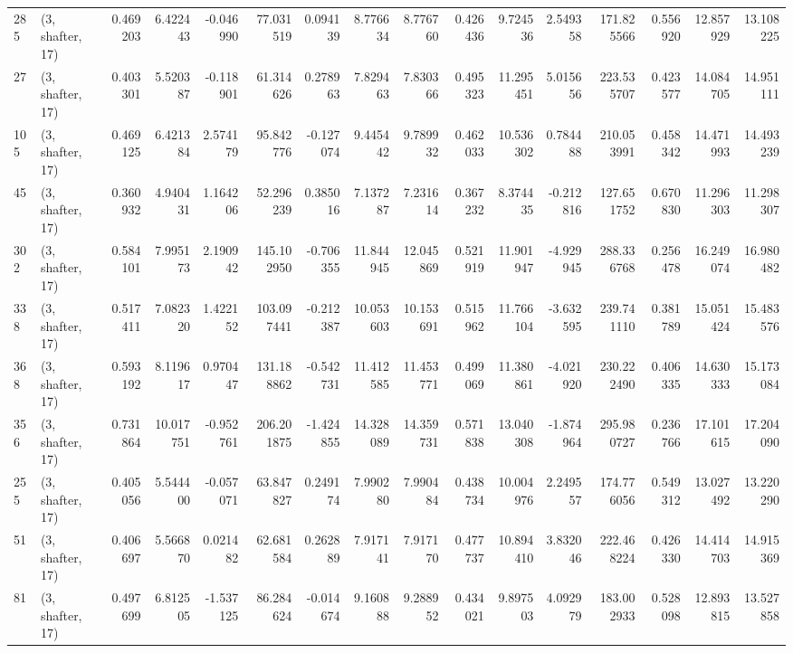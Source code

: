 \begin{tabular}{llrrrrrrrrrrrrrr}
285 &  (3, shafter, 17) &   0.469203 &   6.422443 &  -0.046990 &    77.031519 &   0.094139 &   8.776634 &   8.776760 &  0.426436 &   9.724536 &   2.549358 &   171.825566 &   0.556920 &  12.857929 &  13.108225 \\
27  &  (3, shafter, 17) &   0.403301 &   5.520387 &  -0.118901 &    61.314626 &   0.278963 &   7.829463 &   7.830366 &  0.495323 &  11.295451 &   5.015656 &   223.535707 &   0.423577 &  14.084705 &  14.951111 \\
105 &  (3, shafter, 17) &   0.469125 &   6.421384 &   2.574179 &    95.842776 &  -0.127074 &   9.445442 &   9.789932 &  0.462033 &  10.536302 &   0.784488 &   210.053991 &   0.458342 &  14.471993 &  14.493239 \\
45  &  (3, shafter, 17) &   0.360932 &   4.940431 &   1.164206 &    52.296239 &   0.385016 &   7.137287 &   7.231614 &  0.367232 &   8.374435 &  -0.212816 &   127.651752 &   0.670830 &  11.296303 &  11.298307 \\
302 &  (3, shafter, 17) &   0.584101 &   7.995173 &   2.190942 &   145.102950 &  -0.706355 &  11.844945 &  12.045869 &  0.521919 &  11.901947 &  -4.929945 &   288.336768 &   0.256478 &  16.249074 &  16.980482 \\
338 &  (3, shafter, 17) &   0.517411 &   7.082320 &   1.422152 &   103.097441 &  -0.212387 &  10.053603 &  10.153691 &  0.515962 &  11.766104 &  -3.632595 &   239.741110 &   0.381789 &  15.051424 &  15.483576 \\
368 &  (3, shafter, 17) &   0.593192 &   8.119617 &   0.970447 &   131.188862 &  -0.542731 &  11.412585 &  11.453771 &  0.499069 &  11.380861 &  -4.021920 &   230.222490 &   0.406335 &  14.630333 &  15.173084 \\
356 &  (3, shafter, 17) &   0.731864 &  10.017751 &  -0.952761 &   206.201875 &  -1.424855 &  14.328089 &  14.359731 &  0.571838 &  13.040308 &  -1.874964 &   295.980727 &   0.236766 &  17.101615 &  17.204090 \\
255 &  (3, shafter, 17) &   0.405056 &   5.544400 &  -0.057071 &    63.847827 &   0.249174 &   7.990280 &   7.990484 &  0.438734 &  10.004976 &   2.249557 &   174.776056 &   0.549312 &  13.027492 &  13.220290 \\
51  &  (3, shafter, 17) &   0.406697 &   5.566870 &   0.021482 &    62.681584 &   0.262889 &   7.917141 &   7.917170 &  0.477737 &  10.894410 &   3.832046 &   222.468224 &   0.426330 &  14.414703 &  14.915369 \\
81  &  (3, shafter, 17) &   0.497699 &   6.812505 &  -1.537125 &    86.284624 &  -0.014674 &   9.160888 &   9.288952 &  0.434021 &   9.897503 &   4.092979 &   183.002933 &   0.528098 &  12.893815 &  13.527858 \\

\end{tabular}
